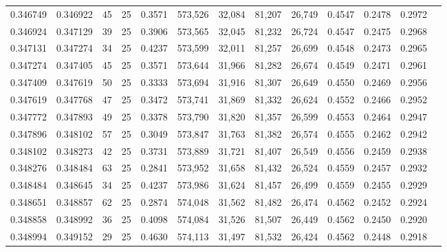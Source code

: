\begin{tabular}{rrrrrrrrrrrrr}
0.346749 & 0.346922 &    45 &  25 &                                     0.3571 & 573,526 &  32,084 &  81,207 &  26,749 & 0.4547 & 0.2478 & 0.2972 \\
0.346924 & 0.347129 &    39 &  25 &                                     0.3906 & 573,565 &  32,045 &  81,232 &  26,724 & 0.4547 & 0.2475 & 0.2968 \\
0.347131 & 0.347274 &    34 &  25 &                                     0.4237 & 573,599 &  32,011 &  81,257 &  26,699 & 0.4548 & 0.2473 & 0.2965 \\
0.347274 & 0.347405 &    45 &  25 &                                     0.3571 & 573,644 &  31,966 &  81,282 &  26,674 & 0.4549 & 0.2471 & 0.2961 \\
0.347409 & 0.347619 &    50 &  25 &                                     0.3333 & 573,694 &  31,916 &  81,307 &  26,649 & 0.4550 & 0.2469 & 0.2956 \\
0.347619 & 0.347768 &    47 &  25 &                                     0.3472 & 573,741 &  31,869 &  81,332 &  26,624 & 0.4552 & 0.2466 & 0.2952 \\
0.347772 & 0.347893 &    49 &  25 &                                     0.3378 & 573,790 &  31,820 &  81,357 &  26,599 & 0.4553 & 0.2464 & 0.2947 \\
0.347896 & 0.348102 &    57 &  25 &                                     0.3049 & 573,847 &  31,763 &  81,382 &  26,574 & 0.4555 & 0.2462 & 0.2942 \\
0.348102 & 0.348273 &    42 &  25 &                                     0.3731 & 573,889 &  31,721 &  81,407 &  26,549 & 0.4556 & 0.2459 & 0.2938 \\
0.348276 & 0.348484 &    63 &  25 &                                     0.2841 & 573,952 &  31,658 &  81,432 &  26,524 & 0.4559 & 0.2457 & 0.2932 \\
0.348484 & 0.348645 &    34 &  25 &                                     0.4237 & 573,986 &  31,624 &  81,457 &  26,499 & 0.4559 & 0.2455 & 0.2929 \\
0.348651 & 0.348857 &    62 &  25 &                                     0.2874 & 574,048 &  31,562 &  81,482 &  26,474 & 0.4562 & 0.2452 & 0.2924 \\
0.348858 & 0.348992 &    36 &  25 &                                     0.4098 & 574,084 &  31,526 &  81,507 &  26,449 & 0.4562 & 0.2450 & 0.2920 \\
0.348994 & 0.349152 &    29 &  25 &                                     0.4630 & 574,113 &  31,497 &  81,532 &  26,424 & 0.4562 & 0.2448 & 0.2918 \\

\end{tabular}
